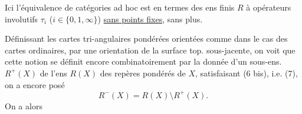 Ici l'équivalence de catégories ad hoc
est en termes des ens finis $R$ à opérateurs involutifs $\tau_i$ ($i\in\{0,1,\infty\}$) \uline{sans points fixes}, sans plus.

Définissant les cartes tri-angulaires pondérées orientées comme dans le cas des cartes ordinaires, par une orientation de la surface top. sous-jacente, on voit que cette notion se définit encore combinatoirement par la donnée d'un sous-ens. $R^+(X)$ de l'ens $R(X)$ des repères pondérés de $X$, satisfaisant (6 bis), i.e. (7),   on a encore posé
\[
R^-(X)=R(X)\setminus R^+(X).
\]
On a alors

